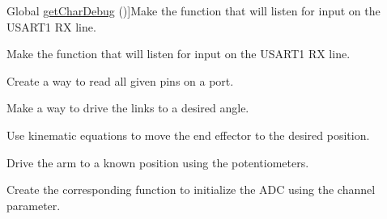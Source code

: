 \begin{DoxyRefList}
\hypertarget{todo__todo000031}{}%
Global \hyperlink{_u_s_a_r_t_debug_8c_a6653563b8e7c5134da2d944ff8ef2f73}{get\-Char\-Debug} ()]Make the function that will listen for input on the U\-S\-A\-R\-T1 R\-X line.  
\item[\label{todo__todo000031}%
\hypertarget{todo__todo000031}{}%
Global \hyperlink{_u_s_a_r_t_debug_8c_a6653563b8e7c5134da2d944ff8ef2f73}{get\-Char\-Debug} ()]Make the function that will listen for input on the U\-S\-A\-R\-T1 R\-X line.  
\item[\label{todo__todo000020}%
\hypertarget{todo__todo000020}{}%
Global \hyperlink{ports_8h_a85e9d6d0f75513f3f961c41861299430}{get\-Pins\-Val} (char port, int num\-Pins,...)]Create a way to read all given pins on a port.  
\item[\label{todo__todo000007}%
\hypertarget{todo__todo000007}{}%
Global \hyperlink{motors_8h_af29dc743a43c233ac843475727db132f}{goto\-Angles} (int lower\-Theta, int upper\-Theta)]Make a way to drive the links to a desired angle.  
\item[\label{todo__todo000008}%
\hypertarget{todo__todo000008}{}%
Global \hyperlink{motors_8h_aa294b49bfcc17cf4b490fb020e359851}{goto\-X\-Y} (int x, int y)]Use kinematic equations to move the end effector to the desired position.  
\item[\label{todo__todo000010}%
\hypertarget{todo__todo000010}{}%
Global \hyperlink{motors_8h_a946fb06843f118c8abacd3aef032584c}{home\-Pos} ()]Drive the arm to a known position using the potentiometers.  
\item[\label{todo__todo000001}%
\hypertarget{todo__todo000001}{}%
Global \hyperlink{_a_d_c_8c_a63cb9d54e7f8593bdc164512c312836b}{init\-A\-D\-C} (int channel, int free)]Create the corresponding function to initialize the A\-D\-C using the channel parameter. 


\end{DoxyRefList}
